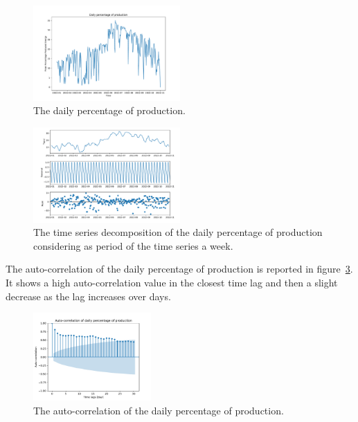 \begin{figure}[H]
\centering
\includegraphics[width=0.5\textwidth]{images/production/data_day_aggregated_plot}
\caption{The daily percentage of production.}
\label{fig:productiondataplotday}
\end{figure}

\begin{figure}[H]
\centering
\includegraphics[width=0.5\textwidth]{images/production/daily_aggregated_decomposition}
\caption{The time series decomposition of the daily percentage of production considering as period of the time series a week.}
\label{fig:productiondecompositionday}
\end{figure}

The auto-correlation of the daily percentage of production is reported in figure~\ref{fig:productioncorrelationday}.
It shows a high auto-correlation value in the closest time lag and then a slight decrease as the lag increases over days.

\begin{figure}[H]
\centering
\includegraphics[width=0.4\textwidth]{images/production/daily_aggregated_correlation}
\caption{The auto-correlation of the daily percentage of production.}
\label{fig:productioncorrelationday}
\end{figure}

